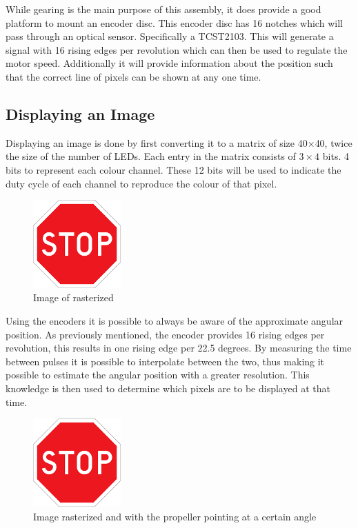 While gearing is the main purpose of this assembly, it does provide a good platform to mount an encoder disc.
This encoder disc has 16 notches which will pass through an optical sensor. 
Specifically a TCST2103.
This will generate a signal with 16 rising edges per revolution which can then be used to regulate the motor speed.
Additionally it will provide information about the position such that the correct line of pixels can be shown at any one time.

\subsection{Displaying an Image}
Displaying an image is done by first converting it to a matrix of size 40$\times$40, twice the size of the number of LEDs.
Each entry in the matrix consists of $3\times4$ bits. 4 bits to represent each colour channel.
These 12 bits will be used to indicate the duty cycle of each channel to reproduce the colour of that pixel.

\begin{figure}[H]
		\centering
		\includegraphics[width =0.3\textwidth]{images/stop}
		\caption{Image of rasterized}
		\label{fig:}
\end{figure}
Using the encoders it is possible to always be aware of the approximate angular position.
As previously mentioned, the encoder provides 16 rising edges per revolution, this results in one rising edge per 22.5 degrees.
By measuring the time between pulses it is possible to interpolate between the two, thus making it possible to estimate the angular position with a greater resolution.
This knowledge is then used to determine which pixels are to be displayed at that time.

\begin{figure}[H]
		\centering
		\includegraphics[width =0.3\textwidth]{images/stop}
		\caption{Image rasterized and with the propeller pointing at a certain angle}
		\label{fig:}
\end{figure}

